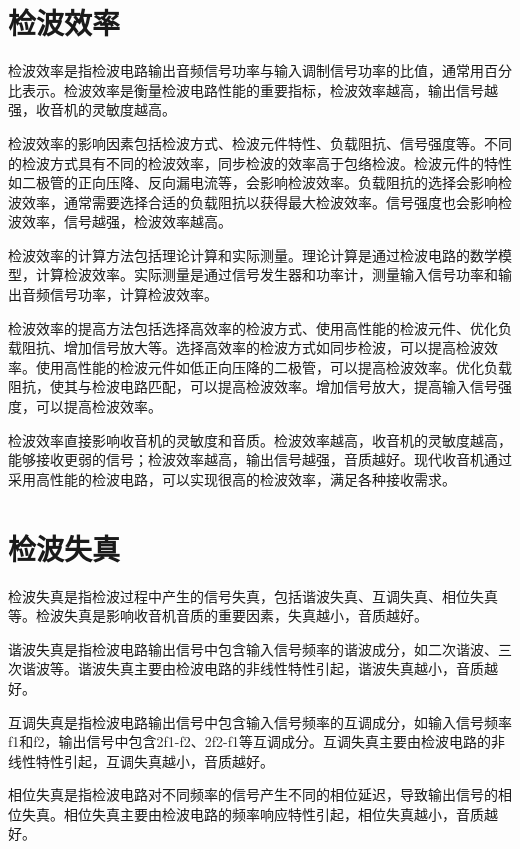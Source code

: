 \documentclass[12pt,UTF8]{ctexbook}
\begin{document}
\section{检波效率}

检波效率是指检波电路输出音频信号功率与输入调制信号功率的比值，通常用百分比表示。检波效率是衡量检波电路性能的重要指标，检波效率越高，输出信号越强，收音机的灵敏度越高。

检波效率的影响因素包括检波方式、检波元件特性、负载阻抗、信号强度等。不同的检波方式具有不同的检波效率，同步检波的效率高于包络检波。检波元件的特性如二极管的正向压降、反向漏电流等，会影响检波效率。负载阻抗的选择会影响检波效率，通常需要选择合适的负载阻抗以获得最大检波效率。信号强度也会影响检波效率，信号越强，检波效率越高。

检波效率的计算方法包括理论计算和实际测量。理论计算是通过检波电路的数学模型，计算检波效率。实际测量是通过信号发生器和功率计，测量输入信号功率和输出音频信号功率，计算检波效率。

检波效率的提高方法包括选择高效率的检波方式、使用高性能的检波元件、优化负载阻抗、增加信号放大等。选择高效率的检波方式如同步检波，可以提高检波效率。使用高性能的检波元件如低正向压降的二极管，可以提高检波效率。优化负载阻抗，使其与检波电路匹配，可以提高检波效率。增加信号放大，提高输入信号强度，可以提高检波效率。

检波效率直接影响收音机的灵敏度和音质。检波效率越高，收音机的灵敏度越高，能够接收更弱的信号；检波效率越高，输出信号越强，音质越好。现代收音机通过采用高性能的检波电路，可以实现很高的检波效率，满足各种接收需求。

\section{检波失真}

检波失真是指检波过程中产生的信号失真，包括谐波失真、互调失真、相位失真等。检波失真是影响收音机音质的重要因素，失真越小，音质越好。

谐波失真是指检波电路输出信号中包含输入信号频率的谐波成分，如二次谐波、三次谐波等。谐波失真主要由检波电路的非线性特性引起，谐波失真越小，音质越好。

互调失真是指检波电路输出信号中包含输入信号频率的互调成分，如输入信号频率f1和f2，输出信号中包含2f1-f2、2f2-f1等互调成分。互调失真主要由检波电路的非线性特性引起，互调失真越小，音质越好。

相位失真是指检波电路对不同频率的信号产生不同的相位延迟，导致输出信号的相位失真。相位失真主要由检波电路的频率响应特性引起，相位失真越小，音质越好。
\end{document}
